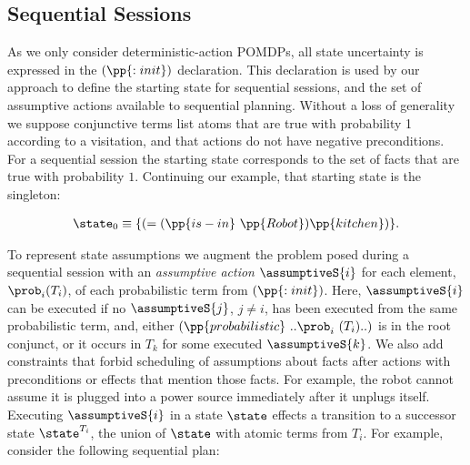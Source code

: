 \subsection{Sequential Sessions}









As we only consider deterministic-action POMDPs, all state uncertainty
is expressed in the $(\pp{:init})$ declaration. This declaration is
used by our approach to define the starting state for sequential
sessions, and the set of assumptive actions available to sequential
planning. Without a loss of generality we suppose conjunctive terms
list atoms that are true with probability 1 according to a visitation,
and that actions do not have negative preconditions. For a sequential
session the starting state corresponds to the set of facts that are
true with probability $1$. Continuing our example, that starting state
is the singleton:

\small
\[
\begin{array}{l}
\state_0 \equiv \{(=(\pp{is-in}~\pp{Robot})\pp{kitchen})\}.
\end{array}
\]
\normalsize

To represent state assumptions we augment the problem posed during a
sequential session with an \emph{assumptive action} $\assumptiveS{i}$
for each element, $\prob_i (T_i)$, of each probabilistic term from
$(\pp{:init})$. Here, $\assumptiveS{i}$ can be executed if no
$\assumptiveS{j}$, $j \neq i$, has been executed from the same
probabilistic term, and, either
$(\pp{probabilistic}~..\prob_i~(T_i)..)$ is in the root conjunct, or
it occurs in $T_k$ for some executed $\assumptiveS{k}$.  We also add
constraints that forbid scheduling of assumptions about facts after
actions with preconditions or effects that mention those facts. For
example, the robot cannot assume it is plugged into a power source
immediately after it unplugs itself.  Executing $\assumptiveS{i}$ in a
state $\state$ effects a transition to a successor state
$\state^{T_i}$, the union of $\state$ with atomic terms from $T_i$.
For example, consider the following sequential plan:

